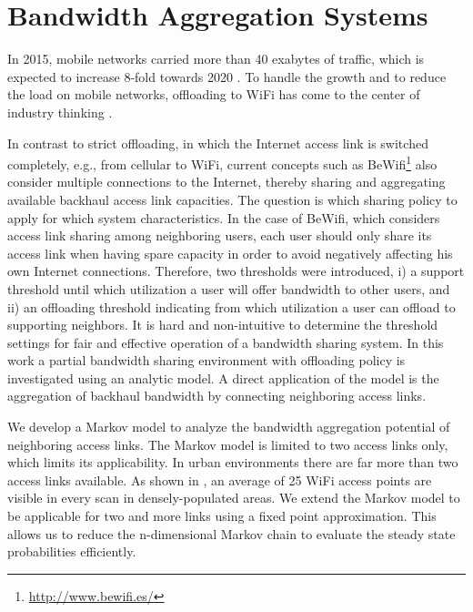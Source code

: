 \chapter{Bandwidth Aggregation Systems}\label{chap:aggregation}

In 2015, mobile networks carried more than 40 exabytes of traffic, which is expected to increase 8-fold towards 2020 \cite{cisco2016mobile}.
To handle the growth and to reduce the load on mobile networks, offloading to WiFi has come to the center of industry thinking \cite{wba2011wifi}.

In contrast to strict offloading, in which the Internet access link is switched completely, e.g., from cellular to WiFi, current concepts such as BeWifi\footnote{\url{http://www.bewifi.es/}} also consider multiple connections to the Internet, thereby sharing and aggregating available backhaul access link capacities. The question is which sharing policy to apply for which system characteristics. In the case of BeWifi, which considers access link sharing among neighboring users, each user should only share its access link when having spare capacity in order to avoid negatively affecting his own Internet connections. Therefore, two thresholds were introduced, i) a support threshold until which utilization a user will offer bandwidth to other users, and ii) an offloading threshold indicating from which utilization a user can offload to supporting neighbors.
It is hard and non-intuitive to determine the threshold settings for fair and effective operation of a bandwidth sharing system.
In this work a partial bandwidth sharing environment with offloading policy is investigated using an analytic model.
A direct application of the model is the aggregation of backhaul bandwidth by connecting neighboring access links.

We develop a Markov model to analyze the bandwidth aggregation potential of neighboring access links.
The Markov model is limited to two access links only, which limits its applicability.
In urban environments there are far more than two access links available.
As shown in \cite{sapiezynski2015tracking}, an average of 25 WiFi access points are visible in every scan in densely-populated areas.
We extend the Markov model to be applicable for two and more links using a fixed point approximation.
This allows us to reduce the n-dimensional Markov chain to evaluate the steady state probabilities efficiently.

